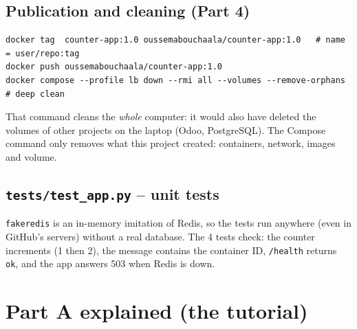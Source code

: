 \documentclass[11pt,a4paper]{article}
\begin{document}
\subsection{Publication and cleaning (Part 4)}
\begin{lstlisting}[language=shell]
docker tag  counter-app:1.0 oussemabouchaala/counter-app:1.0   # name = user/repo:tag
docker push oussemabouchaala/counter-app:1.0
docker compose --profile lb down --rmi all --volumes --remove-orphans   # deep clean
\end{lstlisting}
\begin{warn}
That command cleans the \emph{whole} computer: it would also have deleted the volumes
of other projects on the laptop (Odoo, PostgreSQL). The Compose command only removes
what this project created: containers, network, images and volume.
\end{warn}

\subsection{\texttt{tests/test\_app.py} -- unit tests}

\texttt{fakeredis} is an in-memory imitation of Redis, so the tests run anywhere (even
in GitHub's servers) without a real database. The 4 tests check: the counter
increments (1 then 2), the message contains the container ID, \texttt{/health}
returns \texttt{ok}, and the app answers 503 when Redis is down.

\section{Part A explained (the tutorial)}

\begin{center}
\end{center}
\end{document}
